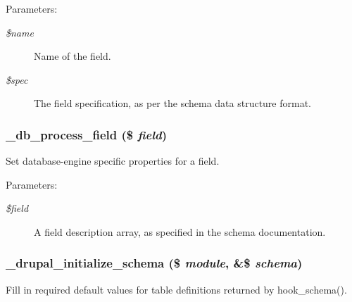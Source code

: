 \begin{Desc}
\item[Parameters:]
\begin{description}
\item[{\em \$name}]Name of the field. \item[{\em \$spec}]The field specification, as per the schema data structure format. \end{description}
\end{Desc}
\hypertarget{group__schemaapi_g4c5486f85f0d1feeb4efba32f01926fb}{
\subsubsection[{\_\-db\_\-process\_\-field}]{\setlength{\rightskip}{0pt plus 5cm}\_\-db\_\-process\_\-field (\$ {\em field})}}
\label{group__schemaapi_g4c5486f85f0d1feeb4efba32f01926fb}


Set database-engine specific properties for a field.

\begin{Desc}
\item[Parameters:]
\begin{description}
\item[{\em \$field}]A field description array, as specified in the schema documentation. \end{description}
\end{Desc}
\hypertarget{group__schemaapi_g7bd9447538f3e7c5baec5d8d67db164c}{
\subsubsection[{\_\-drupal\_\-initialize\_\-schema}]{\setlength{\rightskip}{0pt plus 5cm}\_\-drupal\_\-initialize\_\-schema (\$ {\em module}, \/  \&\$ {\em schema})}}
\label{group__schemaapi_g7bd9447538f3e7c5baec5d8d67db164c}


Fill in required default values for table definitions returned by hook\_\-schema().

